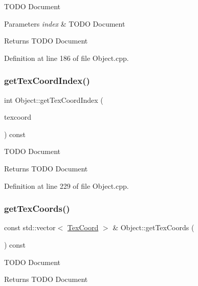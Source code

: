 T\+O\+DO Document 
\begin{DoxyParams}{Parameters}
{\em index} & T\+O\+DO Document \\
\hline
\end{DoxyParams}
\begin{DoxyReturn}{Returns}
T\+O\+DO Document 
\end{DoxyReturn}


Definition at line 186 of file Object.\+cpp.

\mbox{\label{class_object_af99105478aba428c8c252598707323b6}} 
\subsubsection{\texorpdfstring{get\+Tex\+Coord\+Index()}{getTexCoordIndex()}}
{\footnotesize\ttfamily int Object\+::get\+Tex\+Coord\+Index (\begin{DoxyParamCaption}\item[{\hyperlink{struct_tex_coord}{Tex\+Coord}}]{texcoord }\end{DoxyParamCaption}) const}

T\+O\+DO Document \begin{DoxyReturn}{Returns}
T\+O\+DO Document 
\end{DoxyReturn}


Definition at line 229 of file Object.\+cpp.

\mbox{\label{class_object_a215c16f0d10edb9d21d41eca96a782d7}} 
\subsubsection{\texorpdfstring{get\+Tex\+Coords()}{getTexCoords()}}
{\footnotesize\ttfamily const std\+::vector$<$ \hyperlink{struct_tex_coord}{Tex\+Coord} $>$ \& Object\+::get\+Tex\+Coords (\begin{DoxyParamCaption}{ }\end{DoxyParamCaption}) const}

T\+O\+DO Document \begin{DoxyReturn}{Returns}
T\+O\+DO Document 
\end{DoxyReturn}


